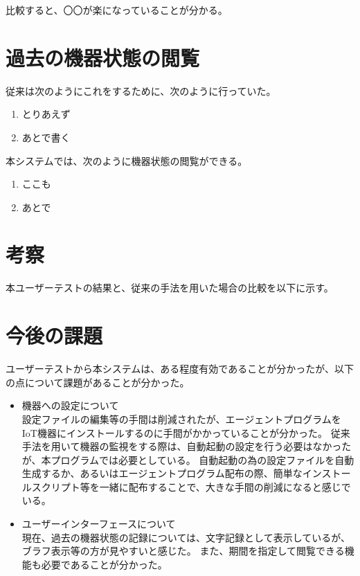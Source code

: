 比較すると、〇〇が楽になっていることが分かる。

\section{過去の機器状態の閲覧}
従来は次のようにこれをするために、次のように行っていた。
\begin{enumerate}
\item とりあえず
\item あとで書く
\end{enumerate}

本システムでは、次のように機器状態の閲覧ができる。
\begin{enumerate}
\item ここも
\item あとで
\end{enumerate}


\section{考察}
本ユーザーテストの結果と、従来の手法を用いた場合の比較を以下に示す。


\section{今後の課題}
ユーザーテストから本システムは、ある程度有効であることが分かったが、以下の点について課題があることが分かった。
\begin{itemize}
\item 機器への設定について\\
	設定ファイルの編集等の手間は削減されたが、エージェントプログラムをIoT機器にインストールするのに手間がかかっていることが分かった。
	従来手法を用いて機器の監視をする際は、自動起動の設定を行う必要はなかったが、本プログラムでは必要としている。
	自動起動の為の設定ファイルを自動生成するか、あるいはエージェントプログラム配布の際、簡単なインストールスクリプト等を一緒に配布することで、大きな手間の削減になると感じでいる。
\item ユーザーインターフェースについて\\
	現在、過去の機器状態の記録については、文字記録として表示しているが、ブラフ表示等の方が見やすいと感じた。
	また、期間を指定して閲覧できる機能も必要であることが分かった。
\end{itemize}


